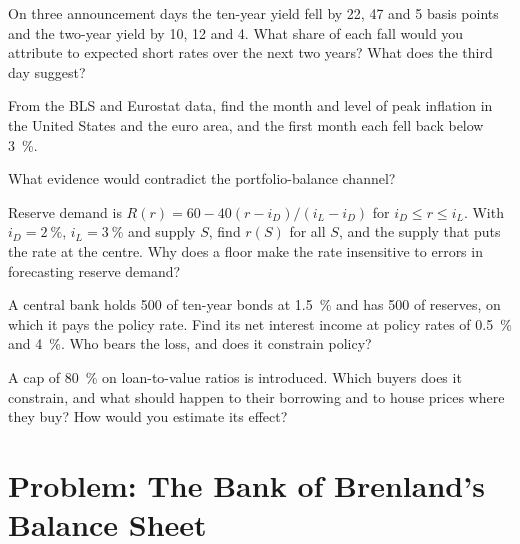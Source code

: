 \begin{exercise}[$\star\star$]\label{exo:b3:central-banking:7}
On three announcement days the ten-year yield fell by 22, 47 and 5 basis points and
the two-year yield by 10, 12 and 4. What share of each fall would you attribute to
expected short rates over the next two years? What does the third day suggest?
\end{exercise}

\begin{exercise}[$\star\star$]\label{exo:b3:central-banking:8}
From the BLS and Eurostat data, find the month and level of peak inflation in the
United States and the euro area, and the first month each fell back below 3~\%.
\end{exercise}

\begin{exercise}[$\star\star$]\label{exo:b3:central-banking:9}
What evidence would contradict the portfolio-balance channel?
\end{exercise}

\begin{exercise}[$\star\star\star$]\label{exo:b3:central-banking:10}
Reserve demand is $R(r) = 60 - 40(r - i_D)/(i_L - i_D)$ for $i_D \le r \le i_L$. With $i_D = 2~\%$, $i_L = 3~\%$
and supply $S$, find $r(S)$ for all $S$, and the supply that puts the rate at the
centre. Why does a floor make the rate insensitive to errors in forecasting
reserve demand?
\end{exercise}

\begin{exercise}[$\star\star\star$]\label{exo:b3:central-banking:11}
A central bank holds 500 of ten-year bonds at 1.5~\% and has 500 of reserves, on
which it pays the policy rate. Find its net interest income at policy rates of 0.5~\%
and 4~\%. Who bears the loss, and does it constrain policy?
\end{exercise}

\begin{exercise}[$\star\star\star$]\label{exo:b3:central-banking:12}
A cap of 80~\% on loan-to-value ratios is introduced. Which buyers does it
constrain, and what should happen to their borrowing and to house prices where
they buy? How would you estimate its effect?
\end{exercise}

\section{Problem: The Bank of Brenland's Balance Sheet}\label{sec:b3:central-banking:problem}

